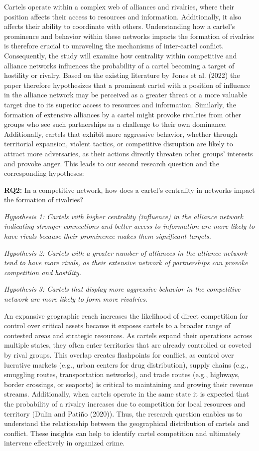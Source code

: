\documentclass[
]{article}
\begin{document}
Cartels operate within a complex web of alliances and rivalries, where
their position affects their access to resources and information.
Additionally, it also affects their ability to coordinate with others.
Understanding how a cartel's prominence and behavior within these
networks impacts the formation of rivalries is therefore crucial to
unraveling the mechanisms of inter-cartel conflict. Consequently, the
study will examine how centrality within competitive and alliance
networks influences the probability of a cartel becoming a target of
hostility or rivalry. Based on the existing literature by Jones et al.
(2022) the paper therefore hypothesizes that a prominent cartel with a
position of influence in the alliance network may be perceived as a
greater threat or a more valuable target due to its superior access to
resources and information. Similarly, the formation of extensive
alliances by a cartel might provoke rivalries from other groups who see
such partnerships as a challenge to their own dominance. Additionally,
cartels that exhibit more aggressive behavior, whether through
territorial expansion, violent tactics, or competitive disruption are
likely to attract more adversaries, as their actions directly threaten
other groups' interests and provoke anger. This leads to our second
research question and the corresponding hypotheses:

\textbf{RQ2:} In a competitive network, how does a cartel's centrality
in networks impact the formation of rivalries?

\emph{Hypothesis 1: Cartels with higher centrality (influence) in the
alliance network indicating stronger connections and better access to
information are more likely to have rivals because their prominence
makes them significant targets.}

\emph{Hypothesis 2: Cartels with a greater number of alliances in the
alliance network tend to have more rivals, as their extensive network of
partnerships can provoke competition and hostility.}

\emph{Hypothesis 3: Cartels that display more aggressive behavior in the
competitive network are more likely to form more rivalries.}

An expansive geographic reach increases the likelihood of direct
competition for control over critical assets because it exposes cartels
to a broader range of contested areas and strategic resources. As
cartels expand their operations across multiple states, they often enter
territories that are already controlled or coveted by rival groups. This
overlap creates flashpoints for conflict, as control over lucrative
markets (e.g., urban centers for drug distribution), supply chains
(e.g., smuggling routes, transportation networks), and trade routes
(e.g., highways, border crossings, or seaports) is critical to
maintaining and growing their revenue streams. Additionally, when
cartels operate in the same state it is expected that the probability of
a rivalry increases due to competition for local resources and territory
(Dulin and Patiño (2020)). Thus, the research question enables us to
understand the relationship between the geographical distribution of
cartels and conflict. These insights can help to identify cartel
competition and ultimately intervene effectively in organized crime.
\end{document}
